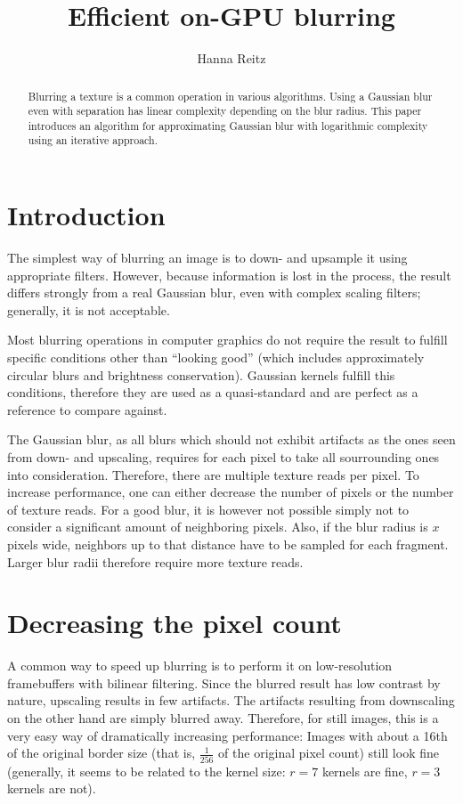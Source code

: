 \documentclass[english,fleqn,10pt,twocolumn]{article}
\date{}
\title{Efficient on-GPU blurring}
\author{Hanna Reitz}
\begin{document}
\maketitle

\begin{abstract}
    Blurring a texture is a common operation in various algorithms. Using a Gaussian blur even with separation has linear complexity depending on the blur radius. This paper introduces an algorithm
    for approximating Gaussian blur with logarithmic complexity using an iterative approach.
\end{abstract}


\section{Introduction}

The simplest way of blurring an image is to down- and upsample it using appropriate filters. However, because information is lost in the process, the result differs strongly from a real Gaussian blur,
even with complex scaling filters; generally, it is not acceptable.

Most blurring operations in computer graphics do not require the result to fulfill specific conditions other than “looking good” (which includes approximately circular blurs and brightness
conservation). Gaussian kernels fulfill this conditions, therefore they are used as a quasi-standard and are perfect as a reference to compare against.

The Gaussian blur, as all blurs which should not exhibit artifacts as the ones seen from down- and upscaling, requires for each pixel to take all sourrounding ones into consideration. Therefore, there
are multiple texture reads per pixel. To increase performance, one can either decrease the number of pixels or the number of texture reads. For a good blur, it is however not possible simply not to
consider a significant amount of neighboring pixels. Also, if the blur radius is $x$ pixels wide, neighbors up to that distance have to be sampled for each fragment. Larger blur radii therefore
require more texture reads.


\section{Decreasing the pixel count}

A common way to speed up blurring is to perform it on low-resolution framebuffers with bilinear filtering. Since the blurred result has low contrast by nature, upscaling results in few artifacts. The
artifacts resulting from downscaling on the other hand are simply blurred away. Therefore, for still images, this is a very easy way of dramatically increasing performance: Images with about a 16th of
the original border size (that is, $\frac 1{256}$ of the original pixel count) still look fine (generally, it seems to be related to the kernel size: $r = 7$ kernels are fine, $r = 3$ kernels are
not).
\end{document}
